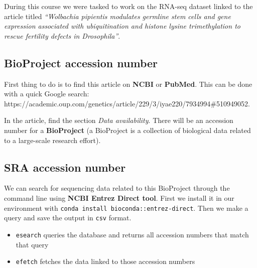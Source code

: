 During this course we were tasked to work on the RNA-seq dataset linked
to the article titled \emph{``Wolbachia pipientis modulates germline
stem cells and gene expression associated with ubiquitination and
histone lysine trimethylation to rescue fertility defects in
Drosophila''}.

\hypertarget{bioproject-accession-number}{%
\subsection{BioProject accession
number}\label{bioproject-accession-number}}

First thing to do is to find this article on \textbf{NCBI} or
\textbf{PubMed}. This can be done with a quick Google search:
https://academic.oup.com/genetics/article/229/3/iyae220/7934994\#510949052.

In the article, find the section \emph{Data availability}. There will be
an accession number for a \textbf{BioProject} (a BioProject is a
collection of biological data related to a large-scale research effort).

\hypertarget{sra-accession-number}{%
\subsection{SRA accession number}\label{sra-accession-number}}

We can search for sequencing data related to this BioProject through the
command line using \textbf{NCBI Entrez Direct tool}. First we install it
in our environment with
\texttt{conda\ install\ bioconda::entrez-direct}. Then we make a query
and save the output in \texttt{csv} format.

\begin{itemize}
\tightlist
\item
  \texttt{esearch} queries the database and returns all accession
  numbers that match that query
\item
  \texttt{efetch} fetches the data linked to those accession numbers
\end{itemize}

\begin{Shaded}
\begin{Highlighting}[]
 \KeywordTok{|}  \OperatorTok{\textgreater{}}
\end{Highlighting}
\end{Shaded}

